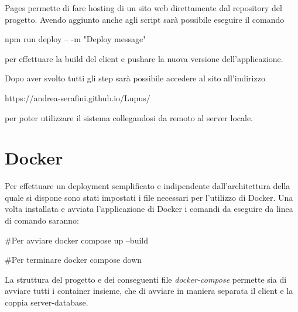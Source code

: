 Pages permette di fare hosting di un sito web direttamente dal repository del progetto. Avendo aggiunto anche  agli script sarà possibile eseguire il comando
\begin{lcverbatim}
    npm run deploy -- -m "Deploy message"
\end{lcverbatim}
per effettuare la build del client e pushare la nuova versione dell'applicazione.

Dopo aver svolto tutti gli step sarà possibile accedere al sito all'indirizzo
\begin{lcverbatim}
    https://andrea-serafini.github.io/Lupus/
\end{lcverbatim}
per poter utilizzare il sistema collegandosi da remoto al server locale.

\section{Docker}
Per effettuare un deployment semplificato e indipendente dall'architettura della quale si dispone sono stati impostati i file necessari per l'utilizzo di Docker.
Una volta installata e avviata l'applicazione di Docker i comandi da eseguire da linea di comando saranno:
\begin{lcverbatim}
#Per avviare
    docker compose up --build

#Per terminare
    docker compose down
\end{lcverbatim}

La struttura del progetto e dei conseguenti file \emph{docker-compose} permette sia di avviare tutti i container insieme, che di avviare in maniera separata il client e la coppia server-database.